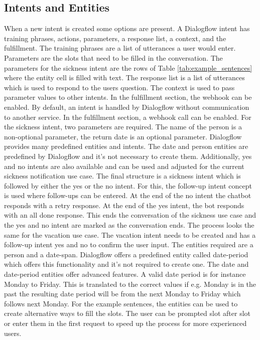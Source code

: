 \subsection{Intents and Entities}
When a new intent is created some options are present.
A Dialogflow intent has training phrases, actions, parameters,
a response list, a context, and the fulfillment.
The training phrases are a list of utterances a user would enter.
Parameters are the slots that need to be filled in the conversation.
The parameters for the sickness intent are the rows of Table \ref{tab:example_sentences} where the entity cell is filled with text.
The response list is a list of utterances which is used to respond to the users question.
The context is used to pass parameter values to other intents.
In the fulfillment section, the webhook can be enabled.
By default, an intent is handled by Dialogflow without communication to another service.
In the fulfillment section, a webhook call can be enabled.
For the sickness intent, two parameters are required.
The name of the person is a non-optional parameter,
the return date is an optional parameter.
Dialogflow provides many predefined entities and intents.
The date and person entities are predefined by Dialogflow and it's 
not necessary to create them.
Additionally, yes and no intents are also available and can be used and 
adjusted for the current sickness notification use case.
The final structure is a sickness intent which is followed by either 
the yes or the no intent.
For this, the follow-up intent concept is used where follow-ups can 
be entered.
At the end of the no intent the chatbot responds with a retry response.
At the end of the yes intent, the bot responds with an all done response.
This ends the conversation of the sickness use case and the yes and no intent are marked as the conversation ends.
The process looks the same for the vacation use case.
The vacation intent needs to be created and has a follow-up intent 
yes and no to confirm the user input.
The entities required are a person and a date-span.
Dialogflow offers a predefined entity called date-period which offers this 
functionality and it's not required to create one.
The date and date-period entities offer advanced features.
A valid date period is for instance Monday to Friday.
This is translated to the correct values if e.g. Monday is in the past
the resulting date period will be from the next Monday to Friday 
which follows next Monday.
For the example sentences, the entities can be used to create alternative ways to fill the slots.
The user can be prompted slot after slot or enter them in the first request to speed up the process for more experienced users.

